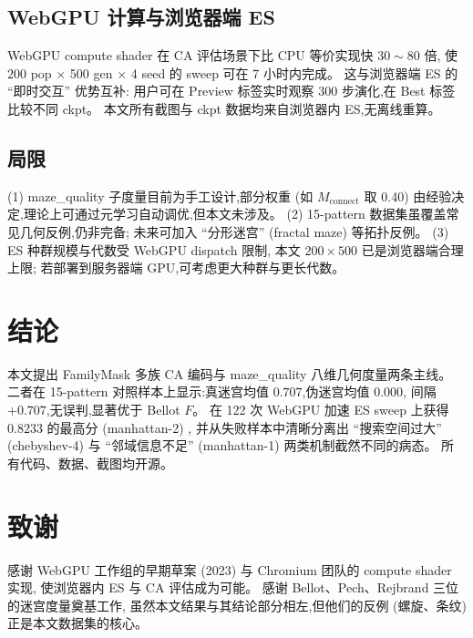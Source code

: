 \documentclass[11pt,a4paper]{article}
\begin{document}
\subsection{WebGPU 计算与浏览器端 ES}
WebGPU compute shader 在 CA 评估场景下比 CPU 等价实现快 $30 \sim 80$ 倍,
使 200 pop $\times$ 500 gen $\times$ 4 seed 的 sweep 可在 7 小时内完成。
这与浏览器端 ES 的 ``即时交互'' 优势互补:
用户可在 Preview 标签实时观察 300 步演化,在 Best 标签比较不同 ckpt。
本文所有截图与 ckpt 数据均来自浏览器内 ES,无离线重算。

\subsection{局限}
(1) maze\_quality 子度量目前为手工设计,部分权重 (如 $M_{\text{connect}}$ 取 0.40)
由经验决定,理论上可通过元学习自动调优,但本文未涉及。
(2) 15-pattern 数据集虽覆盖常见几何反例,仍非完备;
未来可加入 ``分形迷宫'' (fractal maze) 等拓扑反例。
(3) ES 种群规模与代数受 WebGPU dispatch 限制,
本文 $200 \times 500$ 已是浏览器端合理上限;
若部署到服务器端 GPU,可考虑更大种群与更长代数。

\section{结论}
本文提出 FamilyMask 多族 CA 编码与 maze\_quality 八维几何度量两条主线。
二者在 15-pattern 对照样本上显示:真迷宫均值 $0.707$,伪迷宫均值 $0.000$,
间隔 $+0.707$,无误判,显著优于 Bellot $F$。
在 122 次 WebGPU 加速 ES sweep 上获得 $0.8233$ 的最高分 (manhattan-2) ,
并从失败样本中清晰分离出 ``搜索空间过大'' (chebyshev-4) 与 ``邻域信息不足''
(manhattan-1) 两类机制截然不同的病态。
所有代码、数据、截图均开源。

\section*{致谢}
感谢 WebGPU 工作组的早期草案 (2023) 与 Chromium 团队的 compute shader 实现,
使浏览器内 ES 与 CA 评估成为可能。
感谢 Bellot、Pech、Rejbrand 三位的迷宫度量奠基工作,
虽然本文结果与其结论部分相左,但他们的反例 (螺旋、条纹) 正是本文数据集的核心。
\end{document}
